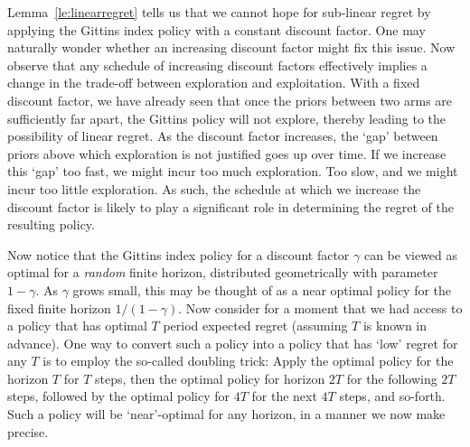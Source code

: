 Lemma~\ref{le:linearregret} tells us that we cannot hope for sub-linear regret by applying the Gittins index policy with a constant discount factor. One may naturally wonder whether an increasing discount factor might fix this issue. Now observe that any schedule of increasing discount factors effectively implies a change in the trade-off between exploration and exploitation. With a fixed discount factor, we have already seen that once the priors between two arms are sufficiently far apart, the Gittins policy will not explore, thereby leading to the possibility of linear regret. As the discount factor increases, the `gap' between priors above which exploration is not justified goes up over time. If we increase this `gap' too fast, we might incur too much exploration. Too slow, and we might incur too little exploration. As such, the schedule at which we increase the discount factor is likely to play a significant role in determining the regret of the resulting policy. 

Now notice that the Gittins index policy for a discount factor $\gamma$ can be viewed as optimal for a {\em random} finite horizon, distributed geometrically with parameter $1-\gamma$. As $\gamma$ grows small, this may be thought of as a near optimal policy for the fixed finite horizon $1/(1-\gamma)$. Now consider for a moment that we had access to a policy that has optimal $T$ period expected regret (assuming $T$ is known in advance). One way to convert such a policy into a policy that has `low' regret for any $T$ is to employ the so-called doubling trick: Apply the optimal policy for the horizon $T$ for $T$ steps, then the optimal policy for horizon $2T$ for the following $2T$ steps, followed by the optimal policy for $4T$ for the next $4T$ steps, and so-forth. Such a policy will be `near'-optimal for any horizon, in a manner we now make precise. 

